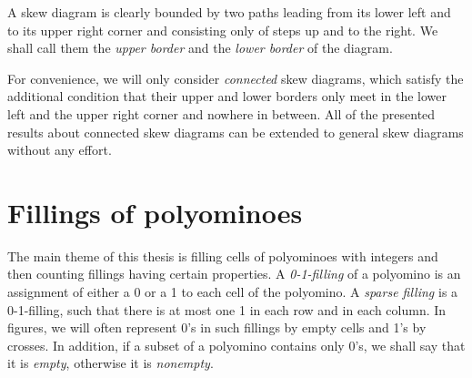 A skew diagram is clearly bounded by two paths leading from its lower left and to its upper right corner
and consisting only of steps up and to the right. We shall call them the \emph{upper border}
and the \emph{lower border} of the diagram.

For convenience, we will only consider \emph{connected} skew diagrams, which satisfy the additional condition that their
upper and lower borders only meet in the lower left and the upper right corner and nowhere in between. All of the presented 
results about connected skew diagrams can be extended to general skew diagrams without any effort.

\section{Fillings of polyominoes}

The main theme of this thesis is filling cells of polyominoes with integers and then counting fillings having certain properties.
A \emph{0-1-filling} of a polyomino is an assignment of either a 0 or a 1 to each cell of the polyomino.
A \emph{sparse filling} is a 0-1-filling, such that there is at most one 1 in each row and in each column. 
In figures, we will often represent 0's in such fillings by empty cells and 1's by crosses. In addition,
if a subset of a polyomino contains only 0's, we shall say that it is \emph{empty}, otherwise it is \emph{nonempty}.

